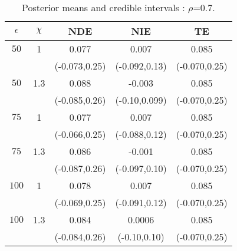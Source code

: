 \documentclass{beamer}
\begin{document}

\begin{frame}

\begin{table}[h]
\caption{Posterior means and credible intervals :
  $\rho$=0.7.}
\centering
\begin{tabular}{c c c c c}
\hline
$\epsilon$ & $\chi$ & NDE & NIE & TE \\ [0.5ex]
\hline
$50$ & 1 & 0.077  & 0.007 & 0.085 \\
 & & (-0.073,0.25) & (-0.092,0.13) & (-0.070,0.25)\\
\hline
$50$ & 1.3 & 0.088  & -0.003 & 0.085 \\
 & & (-0.085,0.26) & (-0.10,0.099) & (-0.070,0.25)\\
\hline
\hline
$75$ & 1 & 0.077  & 0.007 & 0.085 \\
 & & (-0.066,0.25) & (-0.088,0.12) & (-0.070,0.25)\\
\hline
$75$ & 1.3 & 0.086  & -0.001 & 0.085 \\
 & & (-0.087,0.26) & (-0.097,0.10) & (-0.070,0.25)\\
\hline
\hline
$100$ & 1 & 0.078  & 0.007 & 0.085 \\
 & & (-0.069,0.25) & (-0.091,0.12) & (-0.070,0.25)\\
\hline
$100$ & 1.3 & 0.084  & 0.0006 & 0.085 \\
 & & (-0.084,0.26) & (-0.10,0.10) & (-0.070,0.25)\\
\hline
\end{tabular}
\end{table}

\end{frame}
\end{document}
